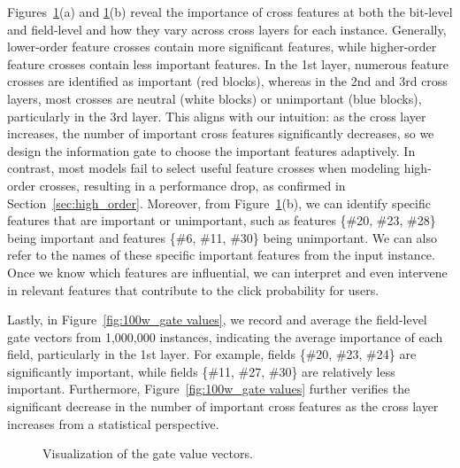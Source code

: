 \documentclass[sigconf]{acmart}
\begin{document}
Figures~\ref{fig:gate_value}(a) and \ref{fig:gate_value}(b) reveal the importance of cross features at both the bit-level and field-level and how they vary across cross layers for each instance. Generally, lower-order feature crosses contain more significant features, while higher-order feature crosses contain less important features. In the 1st layer, numerous feature crosses are identified as important (red blocks), whereas in the 2nd and 3rd cross layers, most crosses are neutral (white blocks) or unimportant (blue blocks), particularly in the 3rd layer. This aligns with our intuition: as the cross layer increases, the number of important cross features significantly decreases, so we design the information gate to choose the important features adaptively. In contrast, most models fail to select useful feature crosses when modeling high-order crosses, resulting in a performance drop, as confirmed in Section~\ref{sec:high_order}. Moreover, from Figure~\ref{fig:gate_value}(b), we can identify specific features that are important or unimportant, such as features \{\#20, \#23, \#28\} being important and features \{\#6, \#11, \#30\} being unimportant. We can also refer to the names of these specific important features from the input instance. Once we know which features are influential, we can interpret and even intervene in relevant features that contribute to the click probability for users.

Lastly, in Figure~\ref{fig:100w_gate values}, we record and average the field-level gate vectors from 1,000,000 instances, indicating the average importance of each field, particularly in the 1st layer. For example, fields \{\#20, \#23, \#24\} are significantly important, while fields \{\#11, \#27, \#30\} are relatively less important. Furthermore, Figure~\ref{fig:100w_gate values} further verifies the significant decrease in the number of important cross features as the cross layer increases from a statistical perspective.


\begin{figure}[tb]
\setlength{\abovecaptionskip}{0.2cm}
\setlength{\belowcaptionskip}{-0.2cm}
\centering
{}

\centering
\caption{Visualization of the gate value vectors. }
\label{fig:gate_value}
\end{figure}
\end{document}
